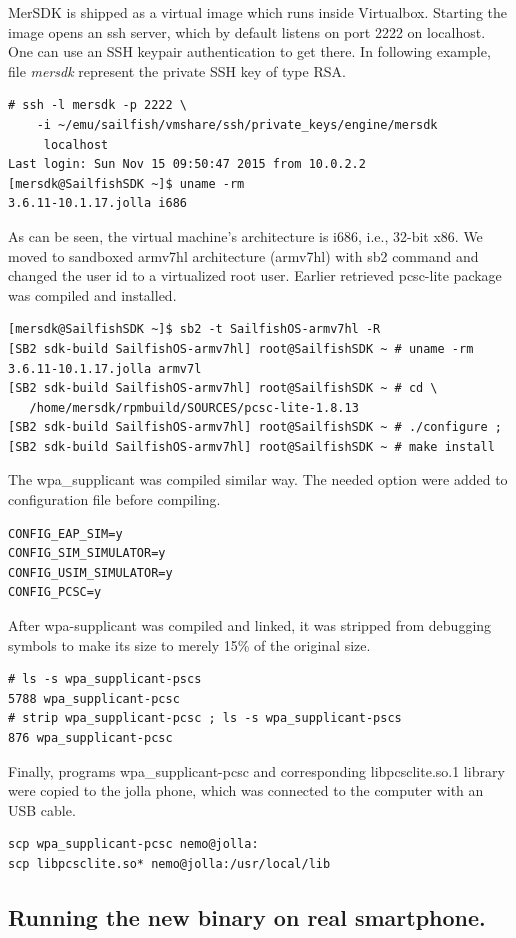 \documentclass[12pt,a4paper,english]{tutthesis}
\begin{document}
\begin{otherlanguage}{english}
MerSDK is shipped as a virtual image which runs inside Virtualbox.
Starting the image opens an ssh server, which by default listens on
port 2222 on localhost. One can use an SSH keypair authentication to get there.
In following example, file \emph{mersdk} represent the private SSH key of type RSA.
\begin{verbatim}
# ssh -l mersdk -p 2222 \
    -i ~/emu/sailfish/vmshare/ssh/private_keys/engine/mersdk
     localhost
Last login: Sun Nov 15 09:50:47 2015 from 10.0.2.2
[mersdk@SailfishSDK ~]$ uname -rm
3.6.11-10.1.17.jolla i686
\end{verbatim}
As can be seen, the virtual machine's architecture is i686, i.e.,
32-bit x86.
We moved to sandboxed armv7hl architecture (armv7hl) with
sb2 command and changed the user id to a virtualized root user.
Earlier retrieved pcsc-lite package was compiled and installed. 
\begin{verbatim}
[mersdk@SailfishSDK ~]$ sb2 -t SailfishOS-armv7hl -R
[SB2 sdk-build SailfishOS-armv7hl] root@SailfishSDK ~ # uname -rm
3.6.11-10.1.17.jolla armv7l
[SB2 sdk-build SailfishOS-armv7hl] root@SailfishSDK ~ # cd \
   /home/mersdk/rpmbuild/SOURCES/pcsc-lite-1.8.13
[SB2 sdk-build SailfishOS-armv7hl] root@SailfishSDK ~ # ./configure ; 
[SB2 sdk-build SailfishOS-armv7hl] root@SailfishSDK ~ # make install
\end{verbatim}
The wpa\_supplicant was compiled similar way. The needed option were
added to configuration file before compiling.
\begin{verbatim}
CONFIG_EAP_SIM=y
CONFIG_SIM_SIMULATOR=y
CONFIG_USIM_SIMULATOR=y
CONFIG_PCSC=y
\end{verbatim}
After wpa-supplicant was compiled and linked, it was stripped from
debugging symbols to make its size to merely 15\% of the original size.
\begin{verbatim}
# ls -s wpa_supplicant-pscs
5788 wpa_supplicant-pcsc
# strip wpa_supplicant-pcsc ; ls -s wpa_supplicant-pscs
876 wpa_supplicant-pcsc
\end{verbatim}
Finally, programs wpa\_supplicant-pcsc and corresponding
libpcsclite.so.1 library were copied to the jolla phone, which was
connected to the computer with an USB cable.
\begin{verbatim}
scp wpa_supplicant-pcsc nemo@jolla:
scp libpcsclite.so* nemo@jolla:/usr/local/lib
\end{verbatim}


\subsection{Running the new binary on real smartphone.}
\label{sec-5-3-2}


\end{otherlanguage}
\end{document}
